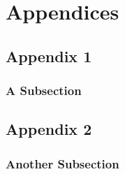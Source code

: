 \documentclass[Book Template.tex]{subfiles}
\begin{document}
    \setcounter{secnumdepth}{-1} %

    \chapter{Appendices}
        \label{ch: Appendices}
        \thispagestyle{noheader}

        \setcounter{secnumdepth}{3} %
        \setcounter{chapter}{1} %

        \section{Appendix 1}

            \subsection{A Subsection}

        \newpage

        \section{Appendix 2}

            \subsection{Another Subsection}
    
\end{document}
